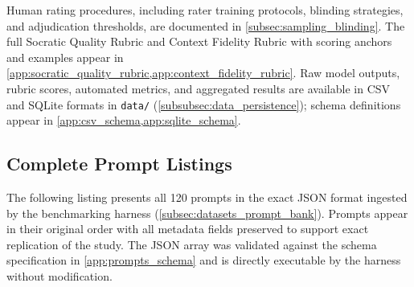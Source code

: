 Human rating procedures, including rater training protocols, blinding strategies, and adjudication thresholds, are documented in \cref{subsec:sampling_blinding}. The full Socratic Quality Rubric and Context Fidelity Rubric with scoring anchors and examples appear in \cref{app:socratic_quality_rubric,app:context_fidelity_rubric}. Raw model outputs, rubric scores, automated metrics, and aggregated results are available in CSV and SQLite formats in \texttt{data/} (\cref{subsubsec:data_persistence}); schema definitions appear in \cref{app:csv_schema,app:sqlite_schema}.

\subsection{Complete Prompt Listings}
\label{app:prompts_listings}

The following listing presents all 120 prompts in the exact JSON format ingested by the benchmarking harness (\cref{subsec:datasets_prompt_bank}). Prompts appear in their original order with all metadata fields preserved to support exact replication of the study. The JSON array was validated against the schema specification in \cref{app:prompts_schema} and is directly executable by the harness without modification.

